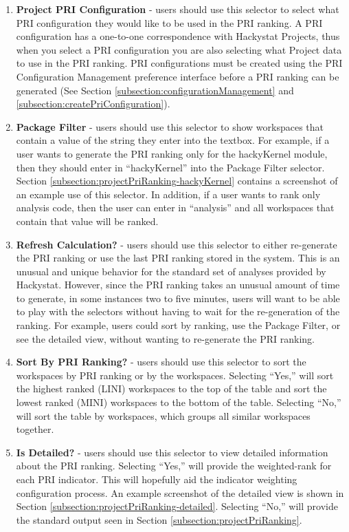 \begin{enumerate}
\item \textbf{Project PRI Configuration} - users should use this selector
  to select what PRI configuration they would like to be used in the PRI
  ranking. A PRI configuration has a one-to-one correspondence with
  Hackystat Projects, thus when you select a PRI configuration you are also
  selecting what Project data to use in the PRI ranking. PRI configurations
  must be created using the PRI Configuration Management preference
  interface before a PRI ranking can be generated (See Section
  \ref{subsection:configurationManagement} and
  \ref{subsection:createPriConfiguration}).
\item \textbf{Package Filter} - users should use this selector to show
  workspaces that contain a value of the string they enter into the
  textbox. For example, if a user wants to generate the PRI ranking only
  for the hackyKernel module, then they should enter in ``hackyKernel''
  into the Package Filter selector.  Section
  \ref{subsection:projectPriRanking-hackyKernel} contains a screenshot of
  an example use of this selector. In addition, if a user wants to rank
  only analysis code, then the user can enter in ``analysis'' and all
  workspaces that contain that value will be ranked.
\item \textbf{Refresh Calculation?} - users should use this selector to
  either re-generate the PRI ranking or use the last PRI ranking stored in
  the system. This is an unusual and unique behavior for the standard set
  of analyses provided by Hackystat. However, since the PRI ranking takes
  an unusual amount of time to generate, in some instances two to five
  minutes, users will want to be able to play with the selectors without
  having to wait for the re-generation of the ranking.  For example, users
  could sort by ranking, use the Package Filter, or see the detailed view,
  without wanting to re-generate the PRI ranking.
\item \textbf{Sort By PRI Ranking?} - users should use this selector to
  sort the workspaces by PRI ranking or by the workspaces. Selecting
  ``Yes,'' will sort the highest ranked (LINI) workspaces to the top of the
  table and sort the lowest ranked (MINI) workspaces to the bottom of the
  table.  Selecting ``No,'' will sort the table by workspaces, which groups
  all similar workspaces together.
\item \textbf{Is Detailed?} - users should use this selector to view
  detailed information about the PRI ranking. Selecting ``Yes,'' will
  provide the weighted-rank for each PRI indicator. This will hopefully aid
  the indicator weighting configuration process. An example screenshot of
  the detailed view is shown in Section
  \ref{subsection:projectPriRanking-detailed}.  Selecting ``No,'' will
  provide the standard output seen in Section
  \ref{subsection:projectPriRanking}.
\end{enumerate}


